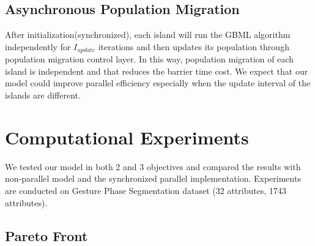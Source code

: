 \documentclass[conference]{IEEEtran}
\begin{document}
  \subsection{Asynchronous Population Migration}
  After initialization(synchronized), each island will run the GBML algorithm independently for $I_{update}$ iterations and then updates its population through population migration control layer. In this way, population migration of each island is independent and that reduces the barrier time cost. We expect that our model could improve parallel efficiency especially when the update interval of the islands are different. 
  
  
  \section{Computational Experiments}

	 We tested our model in both 2 and 3 objectives and compared the results with non-parallel model and the synchronized parallel implementation\cite{nojima2015application}. Experiments are conducted on Gesture Phase Segmentation dataset\cite{Gphase} (32 attributes, 1743 attributes).
  \subsection{Pareto Front}
   
\end{document}
